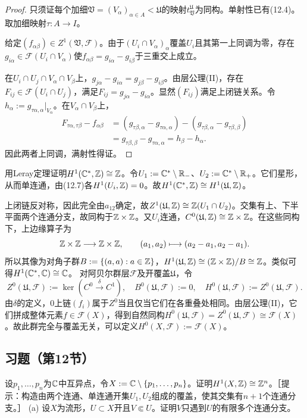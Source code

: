 \begin{proof}
只须证每个加细$\mathfrak V=(V_\alpha)_{\alpha\in A}<\mathfrak U$的映射$t_{\mathfrak V}^{\mathfrak U}$为同构。单射性已有(12.4)。取加细映射$\tau:A\to I$。

给定$(f_{\alpha\beta})\in Z^1(\mathfrak V,\mathcal F)$。由于$(U_i\cap V_\alpha)_\alpha$覆盖$U_i$且其第一上同调为零，存在$g_{i\alpha}\in\mathcal F(U_i\cap V_\alpha)$使$f_{\alpha\beta}=g_{i\alpha}-g_{i\beta}$于三重交上成立。

在$U_i\cap U_j\cap V_\alpha\cap V_\beta$上，$g_{j\alpha}-g_{i\alpha}=g_{j\beta}-g_{i\beta}$。由层公理(II)，存在$F_{ij}\in\mathcal F(U_i\cap U_j)$，满足$F_{ij}=g_{j\alpha}-g_{i\alpha}$。显然$(F_{ij})$满足上闭链关系。令$h_\alpha:=g_{\tau\alpha,\alpha}|_{V_\alpha}$。在$V_\alpha\cap V_\beta$上，
\begin{align*}
F_{\tau\alpha,\tau\beta}-f_{\alpha\beta}
&=(g_{\tau\beta,\alpha}-g_{\tau\alpha,\alpha})-(g_{\tau\beta,\alpha}-g_{\tau\beta,\beta})\\
&=g_{\tau\beta,\beta}-g_{\tau\alpha,\alpha}=h_\beta-h_\alpha.
\end{align*}
因此两者上同调，满射性得证。
\end{proof}
用Leray定理证明$H^1(\mathbb C^*,\mathbb Z)\cong\mathbb Z$。令$U_1:=\mathbb C^*\setminus\mathbb R_-$、$U_2:=\mathbb C^*\setminus\mathbb R_+$。它们星形，从而单连通，由(12.7)各$H^1(U_i,\mathbb Z)=0$。故$H^1(\mathbb C^*,\mathbb Z)\cong H^1(\mathfrak U,\mathbb Z)$。

上闭链反对称，因此完全由$a_{12}$确定，故$Z^1(\mathfrak U,\mathbb Z)\cong\mathbb Z(U_1\cap U_2)$。交集有上、下半平面两个连通分支，故同构于$\mathbb Z\times\mathbb Z$。又$U_i$连通，$C^0(\mathfrak U,\mathbb Z)\cong\mathbb Z\times\mathbb Z$。在这些同构下，上边缘算子为
\[
\mathbb Z\times\mathbb Z\longrightarrow\mathbb Z\times\mathbb Z,\qquad(a_1,a_2)\longmapsto(a_2-a_1,a_2-a_1).
\]
所以其像为对角子群$B:=\{(a,a):a\in\mathbb Z\}$，$H^1(\mathfrak U,\mathbb Z)\cong(\mathbb Z\times\mathbb Z)/B\cong\mathbb Z$。类似可得$H^1(\mathbb C^*,\mathbb C)\cong\mathbb C$。
对阿贝尔群层$\mathcal F$及开覆盖$\mathfrak U$，令
\[
Z^0(\mathfrak U,\mathcal F):=\ker(C^0\xrightarrow\delta C^1),\quad B^0(\mathfrak U,\mathcal F):=0,\quad H^0(\mathfrak U,\mathcal F):=Z^0(\mathfrak U,\mathcal F).
\]
由$\delta$的定义，0上链$(f_i)$属于$Z^0$当且仅当它们在各重叠处相同。由层公理(II)，它们拼成整体元素$f\in\mathcal F(X)$，得到自然同构$H^0(\mathfrak U,\mathcal F)=Z^0(\mathfrak U,\mathcal F)\cong\mathcal F(X)$。故此群完全与覆盖无关，可以定义$H^0(X,\mathcal F):=\mathcal F(X)$。
\subsection*{习题（第12节）}
设$p_1,\ldots,p_n$为$\mathbb C$中互异点，令$X:=\mathbb C\setminus\{p_1,\ldots,p_n\}$。证明$H^1(X,\mathbb Z)\cong\mathbb Z^n$。［提示：构造由两个连通、单连通开集$U_1,U_2$组成的覆盖，使其交集有$n+1$个连通分支。］
(a) 设$X$为流形，$U\subset X$开且$V\Subset U$。证明$V$只遇到$U$的有限多个连通分支。

